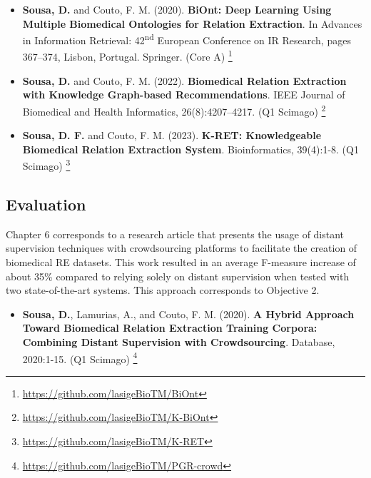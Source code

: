 \begin{itemize}
    \item{\textbf{Sousa, D.} and Couto, F. M. (2020). \textbf{BiOnt: Deep Learning Using Multiple Biomedical Ontologies for Relation Extraction}. In Advances in Information Retrieval: 42\textsuperscript{nd} European Conference on IR Research, pages 367–374, Lisbon, Portugal. Springer. (Core A) \citep{sousa2020biont}} \footnote{\url{https://github.com/lasigeBioTM/BiOnt}}
\end{itemize}

\begin{itemize}
    \item{\textbf{Sousa, D.} and Couto, F. M. (2022). \textbf{Biomedical Relation Extraction with Knowledge Graph-based Recommendations}. IEEE Journal of Biomedical and Health Informatics, 26(8):4207–4217. (Q1 Scimago) \citep{sousa2022biomedical}} \footnote{\url{https://github.com/lasigeBioTM/K-BiOnt}}
\end{itemize}

\begin{itemize}
    \item{\textbf{Sousa, D. F.} and Couto, F. M. (2023). \textbf{K-RET: Knowledgeable Biomedical Relation Extraction System}. Bioinformatics, 39(4):1-8. (Q1 Scimago) \citep{sousa2023k}} \footnote{\url{https://github.com/lasigeBioTM/K-RET}}
\end{itemize}

\subsection{Evaluation}

Chapter 6 corresponds to a research article that presents the usage of distant supervision techniques with crowdsourcing platforms to facilitate the creation of biomedical RE datasets. This work resulted in an average F-measure increase of about 35\% compared to relying solely on distant supervision when tested with two state-of-the-art systems. This approach corresponds to Objective 2. 

\begin{itemize}
    \item{\textbf{Sousa, D.}, Lamurias, A., and Couto, F. M. (2020). \textbf{A Hybrid Approach Toward Biomedical Relation Extraction Training Corpora: Combining Distant Supervision with Crowdsourcing}. Database, 2020:1-15. (Q1 Scimago) \citep{sousa2020hybrid}} \footnote{\url{https://github.com/lasigeBioTM/PGR-crowd}}
\end{itemize}

